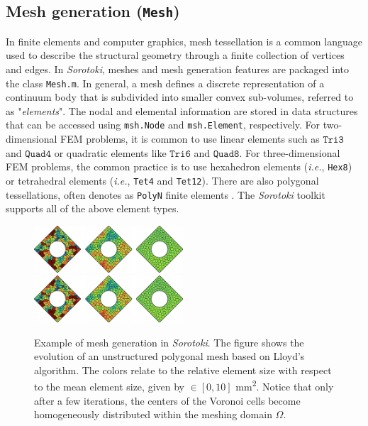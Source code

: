 \subsection{Mesh generation (\texttt{Mesh})}
\label{sec:C5:mesh}
In finite elements and computer graphics, mesh tessellation is a common language used to describe the structural geometry through a finite collection of vertices and edges. In \textit{Sorotoki}, meshes and mesh generation features are packaged into the class \texttt{Mesh.m}. In general, a mesh defines a discrete representation of a continuum body that is subdivided into smaller convex sub-volumes, referred to as "\textit{elements}". The nodal and elemental information are stored in data structures that can be accessed using \texttt{msh.Node} and \texttt{msh.Element}, respectively. For two-dimensional FEM problems, it is common to use linear elements such as $\texttt{Tri3}$ and $\texttt{Quad4}$ or quadratic elements like $\texttt{Tri6}$ and $\texttt{Quad8}$. For three-dimensional FEM problems, the common practice is to use hexahedron elements (\textit{i.e.}, \texttt{Hex8}) or tetrahedral elements (\textit{i.e.}, \texttt{Tet4} and \texttt{Tet12}). There are also polygonal tessellations, often denotes as \texttt{PolyN} finite elements \cite{Talischi2012Mar}. The \textit{Sorotoki} toolkit supports all of the above element types.
%
\begin{figure}[!b]
    \centering
    \includegraphics*[width=0.495\textwidth]{./pdf/thesis-figure-6-4.pdf}
    \includegraphics*[width=0.495\textwidth]{./pdf/thesis-figure-6-4.pdf}
    \caption{Example of mesh generation in \textit{Sorotoki}. The figure shows the evolution of an unstructured polygonal mesh based on Lloyd's algorithm. The colors relate to the relative element size with respect to the mean element size, given by \protect{}$\!\!\in [0,10]$ \si{\milli \meter \squared}. Notice that only after a few iterations, the centers of the Voronoi cells become homogeneously distributed within the meshing domain $\Omega$.}
    \label{fig:sorotoki:meshexample}
    \vspace{-3mm}
\end{figure}

